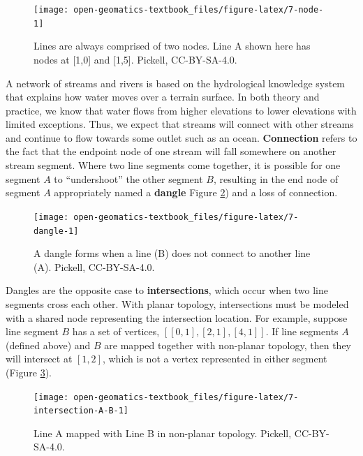 \documentclass[
]{book}
\begin{document}
\begin{figure}

{\centering \texttt{[image: open-geomatics-textbook\_files/figure-latex/7-node-1]} 

}

\caption{Lines are always comprised of two nodes. Line A shown here has nodes at [1,0] and [1,5]. Pickell, CC-BY-SA-4.0.}\label{fig:7-node}
\end{figure}

A network of streams and rivers is based on the hydrological knowledge system that explains how water moves over a terrain surface. In both theory and practice, we know that water flows from higher elevations to lower elevations with limited exceptions. Thus, we expect that streams will connect with other streams and continue to flow towards some outlet such as an ocean. \textbf{Connection} refers to the fact that the endpoint node of one stream will fall somewhere on another stream segment. Where two line segments come together, it is possible for one segment \(A\) to ``undershoot'' the other segment \(B\), resulting in the end node of segment \(A\) appropriately named a \textbf{dangle} Figure \ref{fig:7-dangle}) and a loss of connection.

\begin{figure}

{\centering \texttt{[image: open-geomatics-textbook\_files/figure-latex/7-dangle-1]} 

}

\caption{A dangle forms when a line (B) does not connect to another line (A). Pickell, CC-BY-SA-4.0.}\label{fig:7-dangle}
\end{figure}

Dangles are the opposite case to \textbf{intersections}, which occur when two line segments cross each other. With planar topology, intersections must be modeled with a shared node representing the intersection location. For example, suppose line segment \(B\) has a set of vertices, \([[0,1],[2,1],[4,1]]\). If line segments \(A\) (defined above) and \(B\) are mapped together with non-planar topology, then they will intersect at \([1,2]\), which is not a vertex represented in either segment (Figure \ref{fig:7-intersection-A-B}).

\begin{figure}

{\centering \texttt{[image: open-geomatics-textbook\_files/figure-latex/7-intersection-A-B-1]} 

}

\caption{Line A mapped with Line B in non-planar topology. Pickell, CC-BY-SA-4.0.}\label{fig:7-intersection-A-B}
\end{figure}
\end{document}
